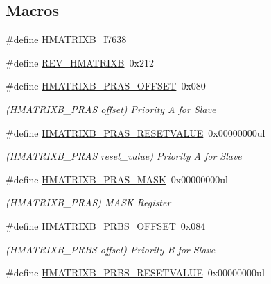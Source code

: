 \subsection*{Macros}
\begin{DoxyCompactItemize}
\item 
\#define \mbox{\hyperlink{group___s_a_m_d21___h_m_a_t_r_i_x_b_ga8913ac76d91200aaaf9a1bc9ddeddd9f}{H\+M\+A\+T\+R\+I\+X\+B\+\_\+\+I7638}}
\item 
\#define \mbox{\hyperlink{group___s_a_m_d21___h_m_a_t_r_i_x_b_gaa1e45777fd379ef2f3cff0401ddaf674}{R\+E\+V\+\_\+\+H\+M\+A\+T\+R\+I\+XB}}~0x212
\item 
\#define \mbox{\hyperlink{group___s_a_m_d21___h_m_a_t_r_i_x_b_gada8f35a5ebe92757fe031cde38a7761c}{H\+M\+A\+T\+R\+I\+X\+B\+\_\+\+P\+R\+A\+S\+\_\+\+O\+F\+F\+S\+ET}}~0x080
\begin{DoxyCompactList}\small\item\em (H\+M\+A\+T\+R\+I\+X\+B\+\_\+\+P\+R\+AS offset) Priority A for Slave \end{DoxyCompactList}\item 
\#define \mbox{\hyperlink{group___s_a_m_d21___h_m_a_t_r_i_x_b_ga2bdb9b1fece4ef8d1a1b1b4e87573191}{H\+M\+A\+T\+R\+I\+X\+B\+\_\+\+P\+R\+A\+S\+\_\+\+R\+E\+S\+E\+T\+V\+A\+L\+UE}}~0x00000000ul
\begin{DoxyCompactList}\small\item\em (H\+M\+A\+T\+R\+I\+X\+B\+\_\+\+P\+R\+AS reset\+\_\+value) Priority A for Slave \end{DoxyCompactList}\item 
\#define \mbox{\hyperlink{group___s_a_m_d21___h_m_a_t_r_i_x_b_ga0b91fa322894f20c4280a0b9e76c9359}{H\+M\+A\+T\+R\+I\+X\+B\+\_\+\+P\+R\+A\+S\+\_\+\+M\+A\+SK}}~0x00000000ul
\begin{DoxyCompactList}\small\item\em (H\+M\+A\+T\+R\+I\+X\+B\+\_\+\+P\+R\+AS) M\+A\+SK Register \end{DoxyCompactList}\item 
\#define \mbox{\hyperlink{group___s_a_m_d21___h_m_a_t_r_i_x_b_ga6885cd77fd1330b5c5d63f0fd50221be}{H\+M\+A\+T\+R\+I\+X\+B\+\_\+\+P\+R\+B\+S\+\_\+\+O\+F\+F\+S\+ET}}~0x084
\begin{DoxyCompactList}\small\item\em (H\+M\+A\+T\+R\+I\+X\+B\+\_\+\+P\+R\+BS offset) Priority B for Slave \end{DoxyCompactList}\item 
\#define \mbox{\hyperlink{group___s_a_m_d21___h_m_a_t_r_i_x_b_ga27bcb999749a62644f8eb6ec5f2503d7}{H\+M\+A\+T\+R\+I\+X\+B\+\_\+\+P\+R\+B\+S\+\_\+\+R\+E\+S\+E\+T\+V\+A\+L\+UE}}~0x00000000ul

\end{DoxyCompactItemize}
